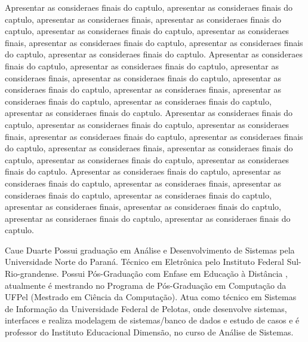 \documentclass[12pt,a4paper,compsoc]{IEEEtran}
\begin{document}
Apresentar as consideraes finais do captulo, apresentar as consideraes finais do captulo, apresentar as consideraes finais, apresentar as consideraes finais do captulo, apresentar as consideraes finais do captulo, apresentar as consideraes finais, apresentar as consideraes finais do captulo, apresentar as consideraes finais do captulo, apresentar as consideraes finais do captulo.
Apresentar as consideraes finais do captulo, apresentar as consideraes finais do captulo, apresentar as consideraes finais, apresentar as consideraes finais do captulo, apresentar as consideraes finais do captulo, apresentar as consideraes finais, apresentar as consideraes finais do captulo, apresentar as consideraes finais do captulo, apresentar as consideraes finais do captulo.
Apresentar as consideraes finais do captulo, apresentar as consideraes finais do captulo, apresentar as consideraes finais, apresentar as consideraes finais do captulo, apresentar as consideraes finais do captulo, apresentar as consideraes finais, apresentar as consideraes finais do captulo, apresentar as consideraes finais do captulo, apresentar as consideraes finais do captulo.
Apresentar as consideraes finais do captulo, apresentar as consideraes finais do captulo, apresentar as consideraes finais, apresentar as consideraes finais do captulo, apresentar as consideraes finais do captulo, apresentar as consideraes finais, apresentar as consideraes finais do captulo, apresentar as consideraes finais do captulo, apresentar as consideraes finais do captulo.






\begin{IEEEbiography}{Caue Duarte}
Possui graduação em Análise e Desenvolvimento de Sistemas pela Universidade Norte do Paraná. Técnico em Eletrônica pelo Instituto Federal Sul-Rio-grandense. Possui Pós-Graduação com Enfase em Educação à Distância , atualmente é mestrando no Programa de Pós-Graduação em Computação da UFPel (Mestrado em Ciência da Computação). Atua como técnico em Sistemas de Informação da Universidade Federal de Pelotas, onde desenvolve sistemas, interfaces e realiza modelagem de sistemas/banco de dados e estudo de casos e é professor do Instituto Educacional Dimensão, no curso de Análise de Sistemas. 
\end{IEEEbiography}
\end{document}
